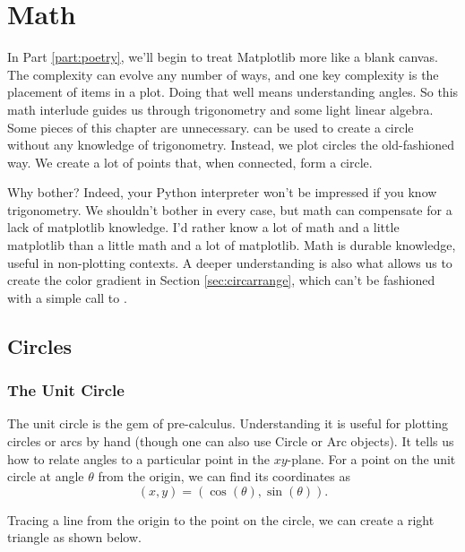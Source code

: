 
\chapter{Math}\label{chapter:math}
In Part \ref{part:poetry}, we'll begin to treat Matplotlib more like a blank canvas. The complexity can evolve any number of ways, and one key complexity is the placement of items in a plot. Doing that well means understanding angles. So this math interlude guides us through trigonometry and some light linear algebra. 
Some pieces of this chapter are unnecessary.  can be used to create a circle without any knowledge of trigonometry. Instead, we plot circles the old-fashioned way. We create a lot of points that, when connected, form a circle. 

Why bother? Indeed, your Python interpreter won't be impressed if you know trigonometry. We shouldn't bother in every case, but math can compensate for a lack of matplotlib knowledge. I'd rather know a lot of math and a little matplotlib than a little math and a lot of matplotlib. Math is durable knowledge, useful in non-plotting contexts. A deeper understanding is also what allows us to create the color gradient in Section \ref{sec:circarrange}, which can't be fashioned with a simple call to .

\section{Circles}

\subsection{The Unit Circle}

The unit circle is the gem of pre-calculus. Understanding it is useful for plotting circles or arcs by hand (though one can also use Circle or Arc objects). It tells us how to relate angles to a particular point in the $xy$-plane. For a point on the unit circle at angle $\theta$ from the origin, we can find its coordinates as $$\left(x,y\right) = \left(\cos(\theta), \sin(\theta)\right).$$

Tracing a line from the origin to the point on the circle, we can create a right triangle as shown below. 

